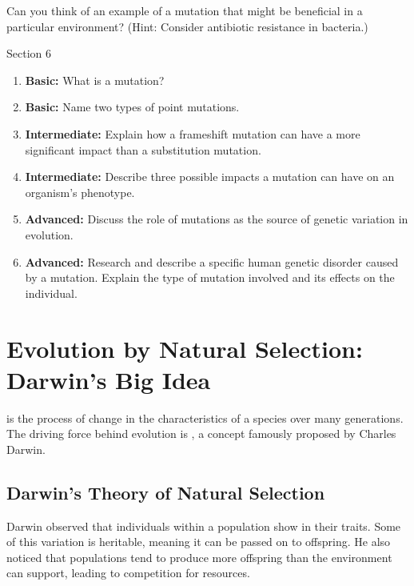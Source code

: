 \begin{stopandthink}
Can you think of an example of a mutation that might be beneficial in a particular environment? (Hint: Consider antibiotic resistance in bacteria.)
\end{stopandthink}


\begin{tieredquestions}{Section 6}

\begin{enumerate}
    \item \textbf{Basic:} What is a mutation?
    \item \textbf{Basic:} Name two types of point mutations.
    \item \textbf{Intermediate:} Explain how a frameshift mutation can have a more significant impact than a substitution mutation.
    \item \textbf{Intermediate:} Describe three possible impacts a mutation can have on an organism's phenotype.
    \item \textbf{Advanced:} Discuss the role of mutations as the source of genetic variation in evolution.
    \item \textbf{Advanced:}  Research and describe a specific human genetic disorder caused by a mutation. Explain the type of mutation involved and its effects on the individual.
\end{enumerate}

\end{tieredquestions}


\section{Evolution by Natural Selection: Darwin's Big Idea}

 is the process of change in the characteristics of a species over many generations.  The driving force behind evolution is , a concept famously proposed by Charles Darwin.

\subsection{Darwin's Theory of Natural Selection}

Darwin observed that individuals within a population show  in their traits. Some of this variation is heritable, meaning it can be passed on to offspring. He also noticed that populations tend to produce more offspring than the environment can support, leading to competition for resources.


